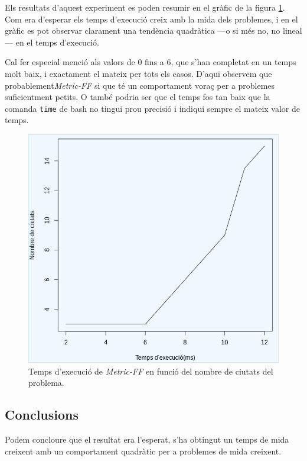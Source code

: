 \documentclass[11pt,a4paper]{article}
\begin{document}
Els resultats d'aquest experiment es poden resumir en el gràfic de la figura \ref{fig:grafic_experiment}. Com era d'esperar els temps d'execució creix amb la mida dels problemes, i en el gràfic es pot observar clarament una tendència quadràtica ---o si més no, no lineal--- en el temps d'execució.  

Cal fer especial menció als valors de 0 fins a 6, que s'han completat en un temps molt baix, i exactament el mateix per tots els casos. D'aqui observem que probablement\emph{Metric-FF} si que té un comportament voraç per a problemes suficientment petits. O també podria ser que el temps fos tan baix que la comanda \texttt{time} de bash no tingui prou precisió i indiqui sempre el mateix valor de temps.

\begin{figure}[hbt]
\includegraphics[width=\textwidth]{./grafic_experiment.png}
\caption{Temps d'execució de \emph{Metric-FF} en funció del nombre de ciutats del problema.}
\label{fig:grafic_experiment}
\end{figure}


\subsection{Conclusions}

Podem concloure que el resultat era l'esperat, s'ha obtingut un temps de mida creixent amb un comportament quadràtic per a problemes de mida creixent.
\end{document}
